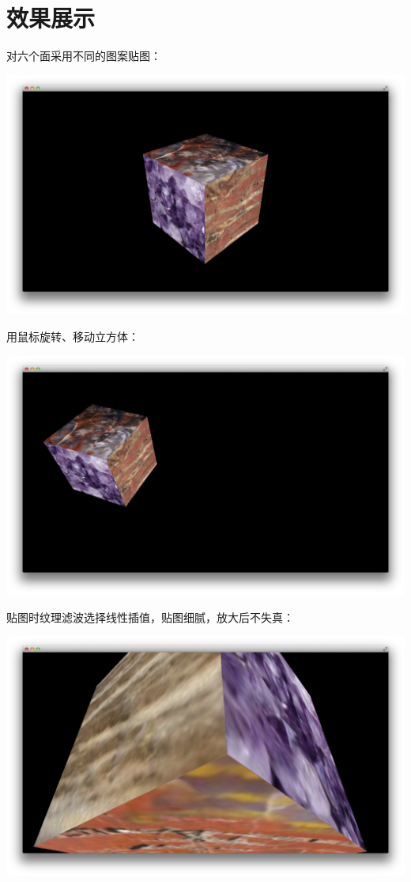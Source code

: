 \documentclass[12pt]{article}
\begin{document}
\section{效果展示}
对六个面采用不同的图案贴图：
\begin{center}
\includegraphics[width = 6in]{1.png} 
\end{center}
用鼠标旋转、移动立方体：
\begin{center}
\includegraphics[width = 6in]{2.png} 
\end{center}
贴图时纹理滤波选择线性插值，贴图细腻，放大后不失真：
\begin{center}
\includegraphics[width = 6in]{3.png} 
\end{center}
\end{document}
